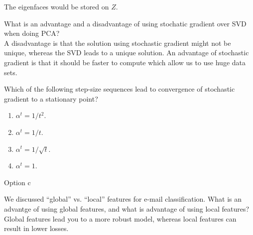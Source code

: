 \documentclass{article}
\def\ans#1{{\color{ans}#1}}
\def\enum#1{\begin{enumerate}#1\end{enumerate}}
\begin{document}
{\ans{
    The eigenfaces would be stored on $Z$.
}
\item What is an advantage and a disadvantage of using stochatic gradient over SVD when doing PCA?  \\
\ans{
    A disadvantage is that the solution using stochastic gradient might not be unique, whereas the 
    SVD leads to a unique solution. An advantage of stochastic gradient is that it should be faster 
    to compute which allow us to use huge data sets.
}
\item Which of the following step-size sequences lead to convergence of stochastic gradient to a stationary point?  \\
\enum{
\item $\alpha^t = 1/t^2$.
\item $\alpha^t = 1/t$.
\item $\alpha^t = 1/\sqrt{t}$.
\item $\alpha^t = 1$.
}
\ans{
    Option c
}
\item We discussed ``global'' vs. ``local'' features for e-mail classification. What is an advantge of using global features, and what is advantage of using local features? \\
\ans{
    Global features lead you to a more robust model, whereas local features can result in lower losses.
}
}
\end{document}
